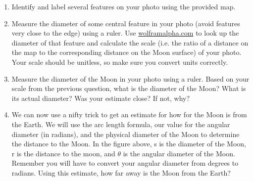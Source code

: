 \documentclass[12pt]{article}%
\begin{document}
\begin{enumerate}

    \item Identify and label several features on your photo using the provided map.
    
    \item Measure the diameter of some central feature in your photo (avoid features very close to the edge) using a ruler. Use \url{wolframalpha.com} to look up the diameter of that feature and calculate the scale (i.e. the ratio of a distance on the map to the corresponding distance on the Moon surface) of your photo. Your scale should be unitless, so make sure you convert units correctly. 
    
    \item Measure the diameter of the Moon in your photo using a ruler. Based on your scale from the previous question, what is the diameter of the Moon? What is its actual diameter? Was your estimate close? If not, why?
    
    \item We can now use a nifty trick to get an estimate for how for the Moon is from the Earth. We will use the arc length formula, our value for the angular diameter (in radians), and the physical diameter of the Moon to determine the distance to the Moon. In the figure above, s is the diameter of the Moon, r is the distance to the moon, and $\theta$ is the angular diameter of the Moon. Remember you will have to convert your angular diameter from degrees to radians. Using this estimate, how far away is the Moon from the Earth? 
    


\end{enumerate}
\end{document}
